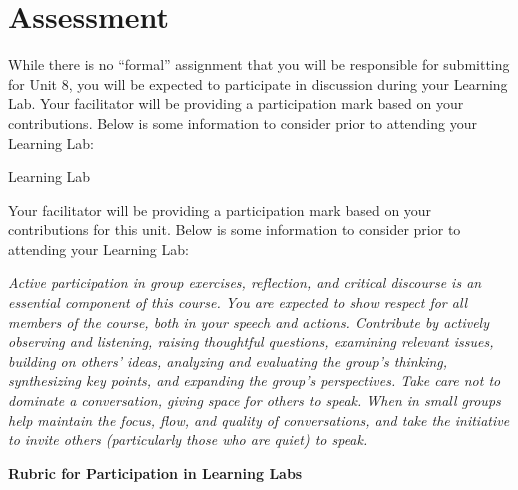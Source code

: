 \documentclass[
]{book}
\begin{document}
\hypertarget{assessment-7}{%
\section*{Assessment}\label{assessment-7}}

\begin{assessment}
While there is no ``formal'' assignment that you will be responsible for submitting for Unit 8, you will be expected to participate in discussion during your Learning Lab. Your facilitator will be providing a participation mark based on your contributions. Below is some information to consider prior to attending your Learning Lab:

{Learning Lab}

Your facilitator will be providing a participation mark based on your contributions for this unit. Below is some information to consider prior to attending your Learning Lab:

\emph{Active participation in group exercises, reflection, and critical discourse is an essential component of this course. You are expected to show respect for all members of the course, both in your speech and actions. Contribute by actively observing and listening, raising thoughtful questions, examining relevant issues, building on others' ideas, analyzing and evaluating the group's thinking, synthesizing key points, and expanding the group's perspectives. Take care not to dominate a conversation, giving space for others to speak. When in small groups help maintain the focus, flow, and quality of conversations, and take the initiative to invite others (particularly those who are quiet) to speak.}

\textbf{Rubric for Participation in Learning Labs}


\end{assessment}
\end{document}
